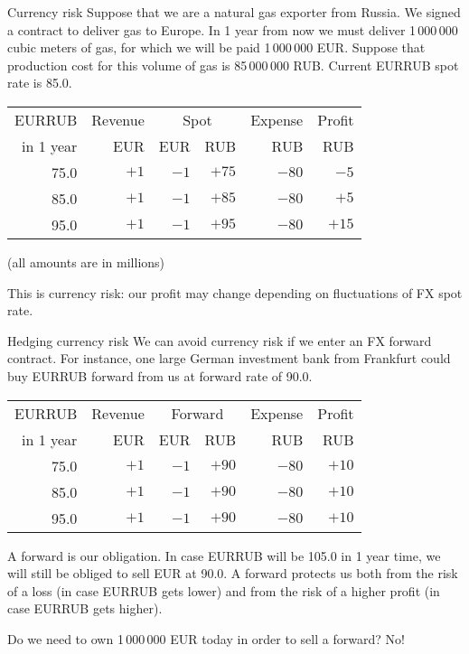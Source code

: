 \documentclass{beamer}
\begin{document}
\begin{frame}{Currency risk}
\justify
Suppose that we are a natural gas exporter from Russia. We signed a contract to deliver gas to Europe. In 1 year from now we must deliver 1\,000\,000 cubic meters of gas, for which we will be paid 1\,000\,000 EUR. Suppose that production cost for this volume of gas is 85\,000\,000 RUB. Current EURRUB spot rate is 85.0.

\justify
\centering
\begin{tabular}{r|r|r|r|r|r}
EURRUB      & Revenue & \multicolumn{2}{c|}{Spot} & Expense & Profit \\
\cline{3-4}
in 1 year   & EUR   & EUR   & RUB & RUB & RUB \\ \hline
75.0        & $+1$  & $-1$ & $+75$         & $-80$  & $-5$ \\
85.0        & $+1$ & $-1$ & $+85$         & $-80$  & $+5$ \\
95.0        & $+1$ & $-1$ & $+95$          & $-80$ & $+15$ 
\end{tabular}

(all amounts are in millions)

\justify
This is \alert{currency risk}: our profit may change depending on fluctuations of FX spot rate.
\end{frame}



\begin{frame}{Hedging currency risk}
\justify
We can avoid currency risk if we enter an FX forward contract. For instance, one large German investment bank from Frankfurt
could buy EURRUB forward from us at forward rate of 90.0.

\justify
\centering
\begin{tabular}{r|r|r|r|r|r}
EURRUB      & Revenue & \multicolumn{2}{c|}{Forward} & Expense & Profit \\
\cline{3-4}
in 1 year   & EUR     & EUR    & RUB              & RUB     & RUB   \\ \hline
75.0        & $+1$  & $-1$ & $+90$  & $-80$ & $+10$  \\
85.0        & $+1$  & $-1$ & $+90$  & $-80$ & $+10$  \\
95.0        & $+1$  & $-1$ & $+90$  & $-80$ & $+10$ 
\end{tabular}

\justify
A forward is our obligation. In case EURRUB will be 105.0 in 1 year time, we will still be obliged to sell EUR at 90.0. A forward protects us both from the risk of a loss (in case EURRUB gets lower) and from the risk of a higher profit (in case EURRUB gets higher).

\justify
Do we need to own 1\,000\,000 EUR today in order to sell a forward? No!
\end{frame}
\end{document}
